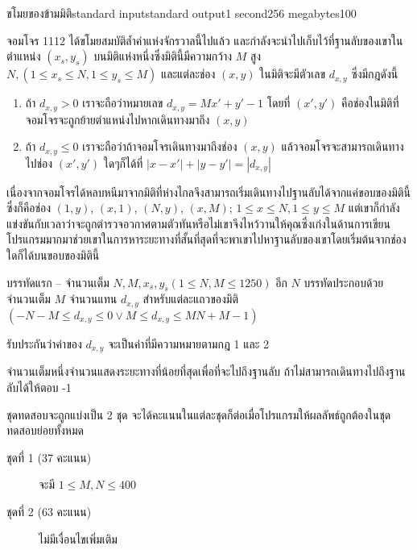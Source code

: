 \documentclass[11pt,a4paper]{article}
\begin{document}
\begin{problem}{ขโมยของข้ามมิติ}{standard input}{standard output}{1 second}{256 megabytes}{100}

จอมโจร 1112 ได้ขโมยสมบัติล้ำค่าแห่งจักรวาลนี้ไปแล้ว และกำลังจะนำไปเก็บไว้ที่ฐานลับของเขาในตำแหน่ง $(x_s,y_s)$ บนมิติแห่งหนึ่งซึ่งมิตินี้มีความกว้าง $M$ สูง $N, (1 \leq x_s \leq N,1 \leq y_s\leq M)$ และแต่ละช่อง $(x,y)$ ในมิติจะมีตัวเลข $d_{x,y}$ ซึ่งมีกฎดังนี้
\begin{enumerate}
\item 
ถ้า $d_{x,y}>0$ เราจะถือว่าหมายเลข $d_{x,y} = Mx' + y'-1$ โดยที่ $(x',y')$ คือช่องในมิติที่จอมโจรจะถูกย้ายตำแหน่งไปหากเดินทางมาถึง $(x,y)$

\item 	ถ้า $d_{x,y} \leq 0$ เราจะถือว่าถ้าจอมโจรเดินทางมาถึงช่อง $(x,y)$ แล้วจอมโจรจะสามารถเดินทางไปช่อง $(x',y')$ ใดๆก็ได้ที่ $|x-x' |+|y-y' |=|d_{x,y}|$

\end{enumerate}

เนื่องจากจอมโจรได้หลบหนีมาจากมิติที่ห่างไกลจึงสามารถเริ่มเดินทางไปฐานลับได้จากแค่ขอบของมิตินี้ ซึ่งก็คือช่อง $(1,y)$, $(x,1)$, 
$(N, y)$, $(x, M)$; $1 \leq x \leq N,1 \leq y \leq M$ แต่เขาก็กำลังแข่งขันกับเวลาว่าจะถูกตำรวจอวกาศตามตัวทันหรือไม่เขาจึงไหว้วานให้คุณซึ่งเก่งในด้านการเขียนโปรแกรมมากมาช่วยเขาในการหาระยะทางที่สั้นที่สุดที่จะพาเขาไปหาฐานลับของเขาโดยเริ่มต้นจากช่องใดก็ได้บนขอบของมิตินี้

\InputFile
บรรทัดแรก – จำนวนเต็ม $N,M,x_s,y_s (1 \leq N,M \leq 1250) $
อีก $N$ บรรทัดประกอบด้วยจำนวนเต็ม $M$ จำนวนแทน $d_{x,y}$ สำหรับแต่ละแถวของมิติ $(-N-M \leq d_{x,y} \leq 0 \lor M \leq d_{x, y} \leq MN+M-1)$

รับประกันว่าค่าของ $d_{x,y}$ จะเป็นค่าที่มีความหมายตามกฎ 1 และ 2

\OutputFile
จำนวนเต็มหนึ่งจำนวนแสดงระยะทางที่น้อยที่สุดเพื่อที่จะไปถึงฐานลับ ถ้าไม่สามารถเดินทางไปถึงฐานลับได้ให้ตอบ -1

\Scoring
ชุดทดสอบจะถูกแบ่งเป็น 2 ชุด จะได้คะแนนในแต่ละชุดก็ต่อเมื่อโปรแกรมให้ผลลัพธ์ถูกต้องในชุดทดสอบย่อยทั้งหมด

\begin{description}

\item[ชุดที่ 1 (37 คะแนน)] จะมี $ 1 \leq M, N \leq 400$

\item[ชุดที่ 2 (63 คะแนน)] ไม่มีเงื่อนไขเพิ่มเติม 

\end{description}


\end{problem}
\end{document}
